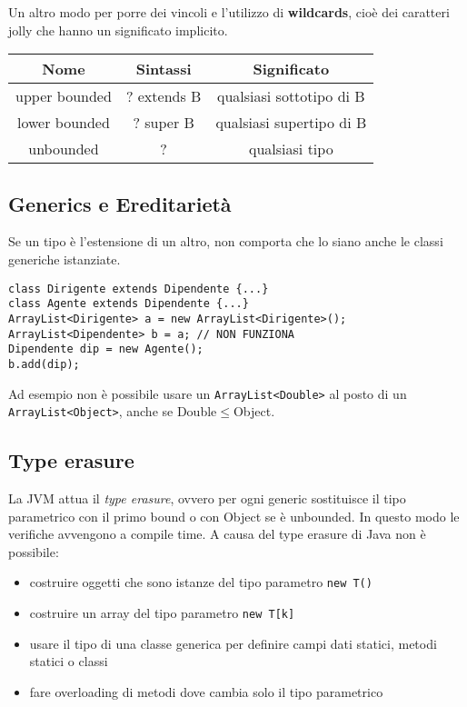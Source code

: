 Un altro modo per porre dei vincoli e l'utilizzo di \textbf{wildcards}, cioè dei caratteri jolly che hanno un significato implicito.

\begin{table}[H]
\centering
\begin{tabular}{|c|c|c|}
\hline
\textbf{Nome} & \textbf{Sintassi} & \textbf{Significato} \\
\hline
upper bounded & ? extends B & qualsiasi sottotipo di B \\
\hline
lower bounded & ? super B & qualsiasi supertipo di B \\
\hline
unbounded & ? & qualsiasi tipo \\
\hline
\end{tabular}
\end{table}

\subsection{Generics e Ereditarietà}
Se un tipo è l'estensione di un altro, non comporta che lo siano anche le classi generiche istanziate. 
\begin{lstlisting}
class Dirigente extends Dipendente {...}
class Agente extends Dipendente {...}
ArrayList<Dirigente> a = new ArrayList<Dirigente>();
ArrayList<Dipendente> b = a; // NON FUNZIONA
Dipendente dip = new Agente();
b.add(dip); 
\end{lstlisting}
Ad esempio non è possibile usare un \texttt{ArrayList<Double>} al posto di un \texttt{ArrayList<Object>}, anche se Double$\le$Object.

\subsection{Type erasure}
La JVM attua il \textit{type erasure}, ovvero per ogni generic sostituisce il tipo parametrico con il primo bound o con Object se è unbounded. In questo modo le verifiche avvengono a compile time. A causa del type erasure di Java non è possibile:
\begin{itemize}
\item costruire oggetti che sono istanze del tipo parametro \texttt{new T()}
\item costruire un array del tipo parametro \texttt{new T[k]}
\item usare il tipo di una classe generica per definire campi dati statici, metodi statici o classi
\item fare overloading di metodi dove cambia solo il tipo parametrico
\end{itemize}

